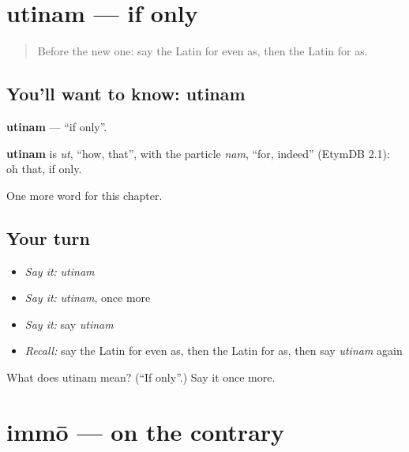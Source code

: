 \section[utinam]{utinam — if only}

\label{lesson:LA-C265-utinam}



\begin{quote}
Before the new one: say the Latin for even as, then the Latin for as.
\end{quote}

\subsection*{You'll want to know: utinam}
\textbf{utinam} — \textquotedblleft{}if only\textquotedblright{}.

\begin{cousinweb}
\textbf{utinam} is \emph{ut}, \textquotedblleft{}how, that\textquotedblright{}, with the particle \emph{nam}, \textquotedblleft{}for, indeed\textquotedblright{} (EtymDB 2.1): oh that, if only.
\end{cousinweb}

\begin{grammarlens}[title={What you've built}]
One more word for this chapter.
\end{grammarlens}

\subsection*{Your turn}
\begin{itemize}
\raggedright
  \item \emph{Say it:} \emph{utinam}
  \item \emph{Say it:} \emph{utinam}, once more
  \item \emph{Say it:} say \emph{utinam}
  \item \emph{Recall:} say the Latin for even as, then the Latin for as, then say \emph{utinam} again
\end{itemize}

\begin{tcolorbox}[breakable,colback=teal!4,colframe=teal!35!black,title={Before you move on}]
What does utinam mean? (\textquotedblleft{}If only\textquotedblright{}.) Say it once more.
\end{tcolorbox}
\section[immō]{immō — on the contrary}

